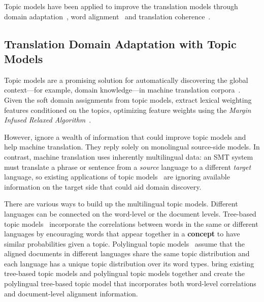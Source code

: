 Topic models have been applied to improve the translation models through domain adaptation~\citep{Eidelman-12,hu-14}, word alignment~\citep{zhao-06} and translation coherence~\citep{xiao-12,xiong-13}.

\subsection{Translation Domain Adaptation with Topic Models}

Topic models are a promising solution for automatically discovering the global context---for example, domain knowledge---in machine translation corpora~\citep{Eidelman-12,hu-14}. Given the soft domain assignments from topic models, \citet{Eidelman-12} extract lexical weighting features conditioned on the topics, optimizing feature weights using the \emph{Margin Infused Relaxed Algorithm}~\citep[\textsc{mira}]{Crammer-06}.

However, \citet{Eidelman-12} ignore a wealth of information that could improve topic models and help machine translation. They reply solely on monolingual source-side models. In contrast, machine translation uses inherently multilingual data: an SMT system must translate a phrase or sentence from a \emph{source} language to a different \emph{target} language, so existing applications of topic models~\citep{Eidelman-12} are ignoring available information on the target side that could aid domain discovery.


There are various ways to build up the multilingual topic models. Different languages can be connected on the word-level or the document levels. Tree-based topic models~\citep{boyd-graber-07,andrzejewski-09,Hu:Boyd-Graber:Satinoff-ur} incorporate the correlations between words in the same or different languages by encouraging words that appear together in a {\bf concept} to have similar probabilities given a topic. Polylingual topic models~\citep{mimno-09} assume that the aligned documents in different languages share the same topic distribution and each language has a unique topic distribution over its word types. \citet{hu-14} bring existing tree-based topic models and polylingual topic models together and create the polylingual tree-based topic model that incorporates both word-level correlations and document-level alignment information.

